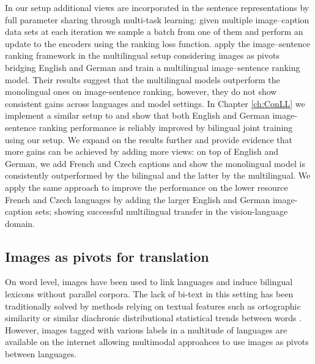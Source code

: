 In our setup additional views are incorporated in the sentence representations
by full parameter sharing through multi-task learning:
given multiple image--caption data sets at each iteration we sample
a batch from one of them and perform an update to the encoders
using the ranking loss function.
\cite{gella2017image} apply the image--sentence ranking framework in the multilingual setup
considering images as pivots bridging English and German and train a multilingual
image--sentence ranking model.
Their results suggest that the multilingual models outperform the monolingual ones on image-sentence
ranking, however, they do not show consistent gains across languages and model settings.
In Chapter \ref{ch:ConLL} we implement a similar setup to \cite{gella2017image}
and  show that both English and German image-sentence
ranking performance is reliably improved by bilingual joint training using our setup.
We expand on the results further and provide evidence that more gains can be
achieved by adding more views: on top of English and German, we
add French and Czech captions and show the monolingual model is consistently
outperformed by the bilingual and the latter by the multilingual.
We apply the same approach to improve the performance on the lower resource
French and Czech languages by adding the larger
English and German image-caption sets; showing successful multilingual
transfer in the vision-language domain.


\subsection{Images as pivots for translation}
\label{sec:imgpivot}

On word level, images have been used to link languages and induce bilingual
lexicons without parallel corpora. The lack of bi-text in this setting has
been traditionally solved by methods relying on textual features
such as ortographic similarity \citep{haghighi2008learning} or similar diachronic distributional
statistical trends between words \citep{schafer2002inducing}.
However, images tagged with various labels in a multitude of languages are
available on the internet allowing multimodal approahces to use images as pivots between
languages. 

